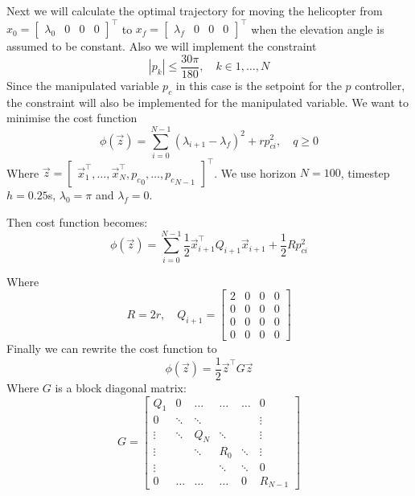 \documentclass[11pt, a4paper, USenglish]{article} %
\begin{document}
Next we will calculate the optimal trajectory for moving the helicopter from $x_0 = \begin{bmatrix}\lambda_0 &0&0&0 \end{bmatrix}^\top$ to $x_f = \begin{bmatrix}\lambda_f &0&0&0 \end{bmatrix}^\top$ when the elevation angle is assumed to be constant. Also we will implement the constraint 
\begin{equation}
    |p_k| \leq \frac{30\pi}{180},\quad k \in {1,\dots,N}
\end{equation}
Since the manipulated variable $p_c$ in this case is the setpoint for the $p$ controller, the constraint will also be implemented for the manipulated variable. We want to minimise the cost function 
\begin{equation}\label{eq:cost_function}
    \phi(\vec{z}) = \sum_{i=0}^{N-1}(\lambda_{i+1}-\lambda_f)^2 + rp_{ci}^2, \quad q\geq0
\end{equation}
Where $\vec{z}=\begin{bmatrix} \vec{x}_1^\top, \dots, \vec{x}_N^\top, {p_c}_{0}, \dots, {p_c}_{N-1} \end{bmatrix}^\top$. We use horizon $N = 100$, timestep $h=0.25$s, $\lambda_0 = \pi$ and $\lambda_f = 0$. 

Then cost function becomes:
\begin{equation}
    \phi(\vec{z}) = \sum_{i=0}^{N-1}\frac12\vec{x}_{i+1}^\top Q_{i+1} \vec{x}_{i+1}+ \frac12Rp_{ci}^2
\end{equation}

Where $$R = 2r, \quad Q_{i+1} = \begin{bmatrix} 2&0&0&0 \\0&0&0&0 \\0&0&0&0 \\0&0&0&0\end{bmatrix}$$
Finally we can rewrite the cost function to
\begin{equation}
    \phi(\vec{z}) = \frac12\vec{z}^\top G \vec{z}
\end{equation}
Where $G$ is a block diagonal matrix:
\begin{equation}
G = 
    \begin{bmatrix}
    Q_1 &0&\dots&\dots&\dots&0 \\
    0 &\ddots&\ddots&&&\vdots \\ 
    \vdots &\ddots&Q_N&\ddots&&\vdots \\ 
    \vdots &&\ddots&R_0&\ddots&\vdots \\ 
    \vdots &&&\ddots&\ddots&0 \\
    0&\dots&\dots&\dots&0&R_{N-1}
    \end{bmatrix}
\end{equation}
\end{document}
